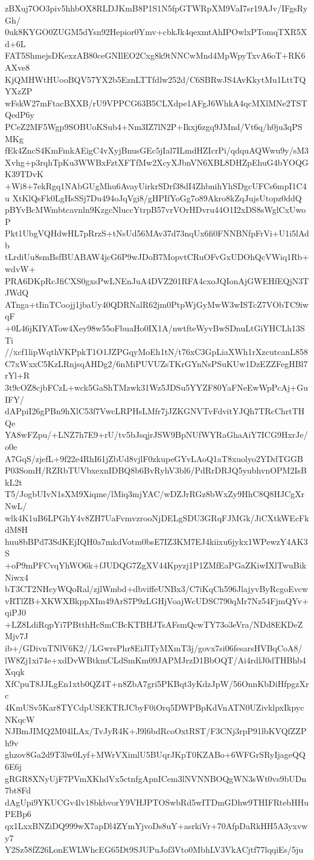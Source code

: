 zBXuj7OO3piv5hhbOX8RLDJKmB8P1S1N5fpGTWRpXM9VaI7sr19AJv/IFgsRyGh/
0uk8KYGO0ZUGM5dYsn92Hepior0Ymv+cbkJk4qexmtAhIPOwlxPTomqTXR5Xd+6L
FAT5ShmejsDKexzAB80ceGNIlEO2Cxg8k9tNNCwMnd4MpWpyTxvA6oT+RK6AXve8
KjQMHWtHUooBQV57YX2b5EznLTTfdlw252d/C6SBRwJS4AvKkytMu1LttTQYXzZP
wFskW27mFtacBXXB/rU9VPPCG63B5CLXdpe1AFgJ6WhkA4qcMXlMNe2TSTQedP6y
PCeZ2MF5Wgp9SOBUoKSub4+Nm3IZ7lN2P+Ikxj6zgq9JMnd/Vt6q/h0ju3qPSMKg
fEk4ZncS4KmFmkAEigC4vXyjBnusGEc5jIal7ILmdHZIcrPi/qdquAQWwu9y/sM3
Xvhg+p3rqhTpKu3WWBxFztXFTfMw2XcyXJbnVN6XBL8DHZpEhuG4bYOQGK39TDvK
+Wi8+7ekRgq1NAbGUgMhu6AvayUirkrSDrf38dI4ZhbnihYhSDgcUFCs6mpI1C4u
XtKlQsFk0LgHsSSj7Du494oJqVgi8/gHPIfYoGg7o89Akro8kZqJujsUtopz0ddQ
pBYvBcMWmbtcavnln9KzgcNluccYtrpB57vrVOrHDvru44O1I2xDS8sWglCxUwoP
Pkt1UbgVQHdwHL7pRrzS+tNsUd56MAv37d73nqUx6fi0FNNBNfpFrVi+U1i5lAdb
tLrdiUu8smBsfBUABAW4jcG6P9wJDoB7MopvtCRuOFvGxUDOhQcVWiq1Rb+wdvW+
PRA6DKpRcJfiCXS0gxsPwLNEnJuA4DVZ201RFA4cxoJQIonAjGWEHfEQjN3TJWdQ
ATnga+tIinTCoojj1jbaUy40QDRNalR62jm0PtpWjGyMwW3wISTcZ7VObTC9iwqF
+0L46jKIYATow4Xey98w55oFbuaHo0IX1A/nwtfteWyvBwSDnuLtGiYHCLh13STi
//xcf1lipWqthVKPpkT1O1JZPGqyMoEh1tN/t76xC3GpLiaXWh1rXzcutcanL858
C7xWxxC5KzLRnjsqAHDg2/6nMiPUVUZsTKrGYnNsPSuKUw1DzEZZFegHBl7rYl+R
3t9cOZ8cjbFCzL+wck5GaShTMzwk31Wz5JDSu5YYZF80YaFNeEwWpPcAj+GuIFY/
dAPpiI26gPBn9hXlC53f7VwcLRPHsLMfr7jJZKGNVTvFdvitYJQh7TRcChrtTHQe
YA8wFZpu/+LNZ7h7E9+rU/tv5bJsqjrJSW9BpNUfWYRaGhaAiY7ICG9HxrJe/o0e
A7GqS/zjefL+9f22e4RhI61jZbUd8vjlF0zkupeGYvLAoQ1aT8xuolyo2YDdTGGB
P03SomH/RZRbTUVbxexnIDBQ8b6BvRyhV3bl6/PdRrDRJQ5yubhvnOPM2IsBkL2t
T5/JogbUIvN1sXM9Xiqme/lMiq3mjYAC/wDZJrRGz8bWxZy9HhC8Q8HJCgXrNwL/
wlk4K1uB6LPGhY4v8ZH7UaFvmvzrooNjDELgSDU3GRqFJMGk/JiCXtkWEcFkdM8H
huu8bBPd73SdKEjIQH0a7mkdVotm0bsE7IZ3KM7EJ4kiixu6jykx1WPewzY4AK3S
+oP9mPFCvqYhWO6k+fJUDQG7ZgXV44Kpyzj1P1ZMfEaPGaZKiwIXlTwuBikNiwx4
bT3CT2NHcyWQoRal/zjlWmbd+dbviffeUNBx3/C7iKqCh596JlajyvByRcgoEvcw
vRTlZB+XKWXBkppXIm49ArS7P9zLGHjVoajWcUDSC790qMr7Nz54FjmQYv+qiPJ0
+LZ8LdiRqpYi7PBtthHcSmCBcKTBHJTsAFsmQcwTY73o3eVra/NDd8EKDeZMjv7J
ib+/GDivnTNlV6K2//LGwrsPhr8EiJlTyMXmT3j/govx7si06fesarsHVBqCoA8/
lW8Zj1xi74e+xdDvWBtkmCLdSmKm09JAPMJrzD1BbOQT/Ai4rdlJ0dTHBhb4Xqqk
XfCpuT8JJLgEn1xtb0QZ4T+n8ZbA7gri5PKBqt3yKdzJpW/56OnnKbDiHfpgzXrc
4KmUSv5Kar8TYCdpUSEKTRJCbyF0iOrq5DWPBpKdVnATN0UZivklpxIkpycNKqcW
NJBmJIMQ2M04lLAx/TvJyR4K+J9l6bdRcoOxtRST/F3CNj3rpP91lbKVQfZZPh9v
ghzov8Ga2d9T3lw0Lyf+MWrVXimlU5BUqrJKpT0KZABo+6WFGrSRyIjageQQ6E6j
gRGR8XNyUjF7PVmXKhdVx5ctnfgApnICem3lNVNNBOQgWN3sWt0vs9bUDn7bt8Fd
dAgUpi9YKUCGv4lv18bkbvorY9VHJPTOSwbRd5wITDmGDhw9THIFRtebHHuPEBp6
qx1LxxBNZiDQ999wX7apDl4ZYmYjvoDs8uY+asrkiVr+70AfpDaRkHH5A3yxvwy7
Y2Sz58fZ26LonEWLWhcEG65Dt9SJUPuJof3Vto0MbhLV3VkACjtf77lqqiEs/5ju
